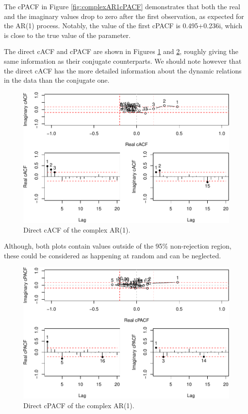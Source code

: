 \documentclass[
]{book}
\begin{document}
The cPACF in Figure \ref{fig:complexAR1cPACF} demonstrates that both the real and the imaginary values drop to zero after the first observation, as expected for the AR(1) process. Notably, the value of the first cPACF is 0.495+0.236i, which is close to the true value of the parameter.

The direct cACF and cPACF are shown in Figures \ref{fig:complexAR1cACFDir} and \ref{fig:complexAR1cpACFDir}, roughly giving the same information as their conjugate counterparts. We should note however that the direct cACF has the more detailed information about the dynamic relations in the data than the conjugate one.

\begin{figure}
\centering
\includegraphics{Svetunkov---Svetunkov---Complex-Valued-Econometrics_files/figure-latex/complexAR1cACFDir-1.pdf}
\caption{\label{fig:complexAR1cACFDir}Direct cACF of the complex AR(1).}
\end{figure}

Although, both plots contain values outside of the 95\% non-rejection region, these could be considered as happening at random and can be neglected.

\begin{figure}
\centering
\includegraphics{Svetunkov---Svetunkov---Complex-Valued-Econometrics_files/figure-latex/complexAR1cpACFDir-1.pdf}
\caption{\label{fig:complexAR1cpACFDir}Direct cPACF of the complex AR(1).}
\end{figure}
\end{document}
